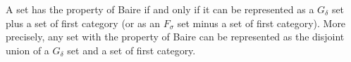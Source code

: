 A set has the property of Baire if and only if it can be represented as a $G_\delta$ set plus a set of first category (or as an $F_\sigma$ set minus a set of first category). More precisely, any set with the property of Baire can be represented as the disjoint union of a $G_\delta$ set and a set of first category.
